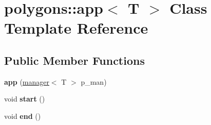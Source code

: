 \hypertarget{classpolygons_1_1app}{\section{polygons\-:\-:app$<$ T $>$ Class Template Reference}
\label{classpolygons_1_1app}
}
\subsection*{Public Member Functions}
\begin{DoxyCompactItemize}
\item 
\hypertarget{classpolygons_1_1app_aff6d276cee6e502fa086aeb1ce4ad2f8}{{\bfseries app} (\hyperlink{classpolygons_1_1manager}{manager}$<$ T $>$ p\-\_\-man)}\label{classpolygons_1_1app_aff6d276cee6e502fa086aeb1ce4ad2f8}

\item 
\hypertarget{classpolygons_1_1app_ae88f2d95274e77881443122ca42a1cd0}{void {\bfseries start} ()}\label{classpolygons_1_1app_ae88f2d95274e77881443122ca42a1cd0}

\item 
\hypertarget{classpolygons_1_1app_a6d7381dafd5d79a0b8f8a945601521f9}{void {\bfseries end} ()}\label{classpolygons_1_1app_a6d7381dafd5d79a0b8f8a945601521f9}

\end{DoxyCompactItemize}

